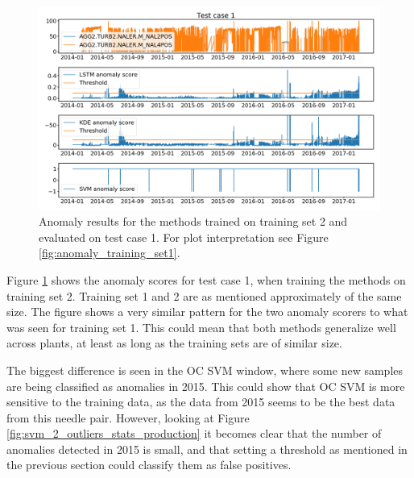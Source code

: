         \begin{figure}[h!]
            \centering
            \includegraphics[width=\textwidth]{report/figures/analysis/plant2_train_short/production_data_anomaly.png}
            \caption{Anomaly results for the methods trained on training set 2 and evaluated on test case 1. For plot interpretation see Figure \ref{fig:anomaly_training_set1}.}
            \label{fig:plant2_short_prod_anomaly_score}
        \end{figure}
        Figure \ref{fig:plant2_short_prod_anomaly_score} shows the anomaly scores for test case 1, when training the methods on training set 2. Training set 1 and 2 are as mentioned approximately of the same size. The figure shows a very similar pattern for the two anomaly scorers to what was seen for training set 1. This could mean that both methods generalize well across plants, at least as long as the training sets are of similar size. 
        
        The biggest difference is seen in the OC SVM window, where some new samples are being classified as anomalies in 2015. This could show that OC SVM is more sensitive to the training data, as the data from 2015 seems to be the best data from this needle pair. However, looking at Figure \ref{fig:svm_2_outliers_stats_production} it becomes clear that the number of anomalies detected in 2015 is small, and that setting a threshold as mentioned in the previous section could classify them as false positives.  
        
